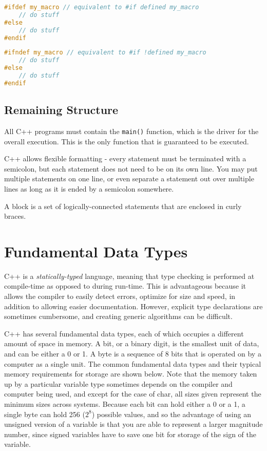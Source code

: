 \documentclass[10pt]{article}
\begin{document}
\begin{lstlisting}[language=C++]
#ifdef my_macro // equivalent to #if defined my_macro
	// do stuff
#else
	// do stuff
#endif
\end{lstlisting}

\begin{lstlisting}[language=C++]
#ifndef my_macro // equivalent to #if !defined my_macro
	// do stuff
#else
	// do stuff
#endif
\end{lstlisting}

\subsection{Remaining Structure}

All C++ programs must contain the \texttt{main()} function, which is the driver for the overall execution. This is the only function that is guaranteed to be executed. 

C++ allows flexible formatting - every statement must be terminated with a semicolon, but each statement does not need to be on its own line. You may put multiple statements on one line, or even separate a statement out over multiple lines as long as it is ended by a semicolon somewhere.

A block is a set of logically-connected statements that are enclosed in curly braces.

\section{Fundamental Data Types}

C++ is a \textit{statically-typed} language, meaning that type checking is performed at compile-time as opposed to during run-time. This is advantageous because it allows the compiler to easily detect errors, optimize for size and speed, in addition to allowing easier documentation. However, explicit type declarations are sometimes cumbersome, and creating generic algorithms can be difficult.

C++ has several fundamental data types, each of which occupies a different amount of space in memory. A bit, or a binary digit, is the smallest unit of data, and can be either a 0 or 1. A byte is a sequence of 8 bits that is operated on by a computer as a single unit. The common fundamental data types and their typical memory requirements for storage are shown below. Note that the memory taken up by a particular variable type sometimes depends on the compiler and computer being used, and except for the case of char, all sizes given represent the minimum sizes across systems. Because each bit can hold either a 0 or a 1, a single byte can hold 256 (\(2^8\)) possible values, and so the advantage of using an unsigned version of a variable is that you are able to represent a larger magnitude number, since signed variables have to save one bit for storage of the sign of the variable. 
\end{document}
